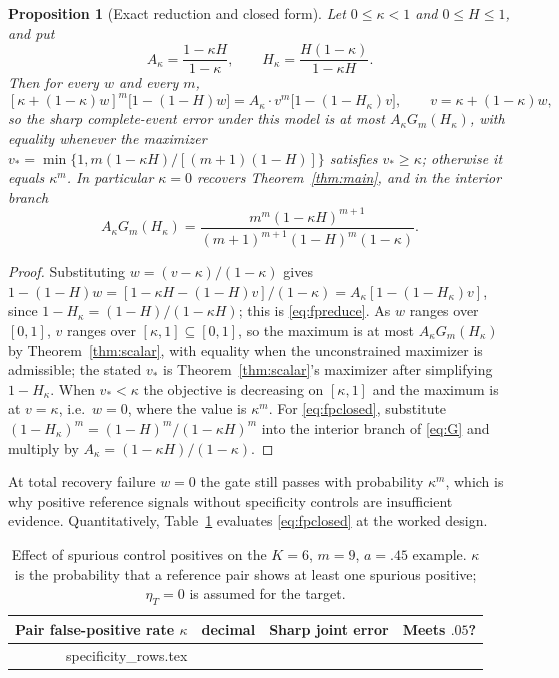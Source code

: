 \documentclass[11pt]{article}
\makeatletter
\let\tableinput\@@input
\newtheorem{proposition}[theorem]{Proposition}
\theoremstyle{remark}\newtheorem{remark}[theorem]{Remark}
\makeatother
\begin{document}
\begin{proposition}[Exact reduction and closed form]\label{prop:fp}
Let $0\le\kappa<1$ and $0\le H\le1$, and put
\begin{equation}\label{eq:AHprime}
A_\kappa=\frac{1-\kappa H}{1-\kappa},\qquad
H_\kappa=\frac{H(1-\kappa)}{1-\kappa H}.
\end{equation}
Then for every $w$ and every $m$,
\begin{equation}\label{eq:fpreduce}
[\kappa+(1-\kappa)w]^m\big[1-(1-H)w\big]
=A_\kappa\cdot v^m\big[1-(1-H_\kappa)v\big],\qquad v=\kappa+(1-\kappa)w,
\end{equation}
so the sharp complete-event error under this model is at most
$A_\kappa G_m(H_\kappa)$, with equality whenever the maximizer
$v_*=\min\{1,m(1-\kappa H)/[(m+1)(1-H)]\}$ satisfies $v_*\ge\kappa$; otherwise
it equals $\kappa^m$. In particular $\kappa=0$ recovers Theorem~\ref{thm:main},
and in the interior branch
\begin{equation}\label{eq:fpclosed}
A_\kappa G_m(H_\kappa)=\frac{m^m(1-\kappa H)^{m+1}}
{(m+1)^{m+1}(1-H)^m(1-\kappa)} .
\end{equation}
\end{proposition}
\begin{proof}
Substituting $w=(v-\kappa)/(1-\kappa)$ gives
$1-(1-H)w=[1-\kappa H-(1-H)v]/(1-\kappa)=A_\kappa[1-(1-H_\kappa)v]$, since
$1-H_\kappa=(1-H)/(1-\kappa H)$; this is \eqref{eq:fpreduce}. As $w$ ranges over
$[0,1]$, $v$ ranges over $[\kappa,1]\subseteq[0,1]$, so the maximum is at most
$A_\kappa G_m(H_\kappa)$ by Theorem~\ref{thm:scalar}, with equality when the
unconstrained maximizer is admissible; the stated $v_*$ is
Theorem~\ref{thm:scalar}'s maximizer after simplifying $1-H_\kappa$. When
$v_*<\kappa$ the objective is decreasing on $[\kappa,1]$ and the maximum is at
$v=\kappa$, i.e.\ $w=0$, where the value is $\kappa^m$. For
\eqref{eq:fpclosed}, substitute $(1-H_\kappa)^m=(1-H)^m/(1-\kappa H)^m$ into the
interior branch of \eqref{eq:G} and multiply by
$A_\kappa=(1-\kappa H)/(1-\kappa)$.
\end{proof}

At total recovery failure $w=0$ the gate still passes with probability
$\kappa^m$, which is why positive reference signals without specificity controls
are insufficient evidence. Quantitatively, Table~\ref{tab:specificity} evaluates
\eqref{eq:fpclosed} at the worked design.

\begin{table}[tb]
\centering\small
\caption{Effect of spurious control positives on the $K=6$, $m=9$, $a=.45$
example. $\kappa$ is the probability that a reference pair shows at least one
spurious positive; $\eta_T=0$ is assumed for the target.}
\label{tab:specificity}
\begin{tabular}{@{}rrrl@{}}\toprule
Pair false-positive rate $\kappa$ & decimal & Sharp joint error & Meets $.05$?\\\midrule
\tableinput specificity_rows.tex
\bottomrule\end{tabular}
\end{table}
\end{document}
